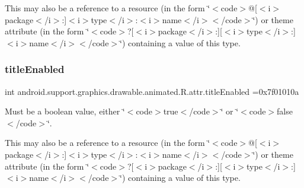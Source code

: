This may also be a reference to a resource (in the form \char`\"{}$<$code$>$@\mbox{[}$<$i$>$package$<$/i$>$\+:\mbox{]}$<$i$>$type$<$/i$>$\+:$<$i$>$name$<$/i$>$$<$/code$>$\char`\"{}) or theme attribute (in the form \char`\"{}$<$code$>$?\mbox{[}$<$i$>$package$<$/i$>$\+:\mbox{]}\mbox{[}$<$i$>$type$<$/i$>$\+:\mbox{]}$<$i$>$name$<$/i$>$$<$/code$>$\char`\"{}) containing a value of this type. \mbox{\label{classandroid_1_1support_1_1graphics_1_1drawable_1_1animated_1_1R_1_1attr_a2c2212684f78c5d0cf825f79078140c1}} 
\subsubsection{\texorpdfstring{title\+Enabled}{titleEnabled}}
{\footnotesize\ttfamily int android.\+support.\+graphics.\+drawable.\+animated.\+R.\+attr.\+title\+Enabled =0x7f01010a\hspace{0.3cm}{\ttfamily [static]}}

Must be a boolean value, either \char`\"{}$<$code$>$true$<$/code$>$\char`\"{} or \char`\"{}$<$code$>$false$<$/code$>$\char`\"{}. 

This may also be a reference to a resource (in the form \char`\"{}$<$code$>$@\mbox{[}$<$i$>$package$<$/i$>$\+:\mbox{]}$<$i$>$type$<$/i$>$\+:$<$i$>$name$<$/i$>$$<$/code$>$\char`\"{}) or theme attribute (in the form \char`\"{}$<$code$>$?\mbox{[}$<$i$>$package$<$/i$>$\+:\mbox{]}\mbox{[}$<$i$>$type$<$/i$>$\+:\mbox{]}$<$i$>$name$<$/i$>$$<$/code$>$\char`\"{}) containing a value of this type. \mbox{\label{classandroid_1_1support_1_1graphics_1_1drawable_1_1animated_1_1R_1_1attr_aa053744d6f8cb58352cc3ef5342a13a1}} 
